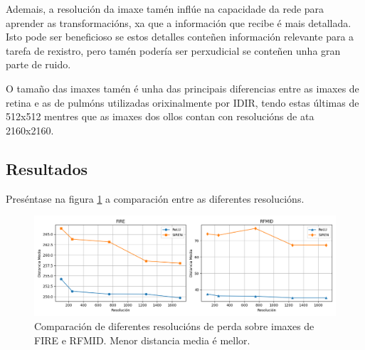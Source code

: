 Ademais, a resolución da imaxe tamén inflúe na capacidade da rede para aprender as transformacións, xa que a información que recibe é mais detallada. 
Isto pode ser beneficioso se estos detalles conteñen información relevante para a tarefa de rexistro, pero tamén podería ser perxudicial se conteñen unha gran parte de ruido.

O tamaño das imaxes tamén é unha das principais diferencias entre as imaxes de retina e as de pulmóns utilizadas orixinalmente por IDIR, tendo estas últimas de 512x512 mentres que as imaxes dos ollos contan con resolucións de ata 2160x2160.

\subsection{Resultados}
\label{subsec:Resultados-resolution}

Preséntase na figura \ref{fig:resoluciónchart} a comparación entre as diferentes resolucións.

\begin{figure}[ht]
    \centering
    \includegraphics[width=1\textwidth]{imaxes/resolutionchart.png}
    \caption{Comparación de diferentes resolucións de perda sobre imaxes de FIRE e RFMID. Menor distancia media é mellor.}
    \label{fig:resoluciónchart}
\end{figure}


